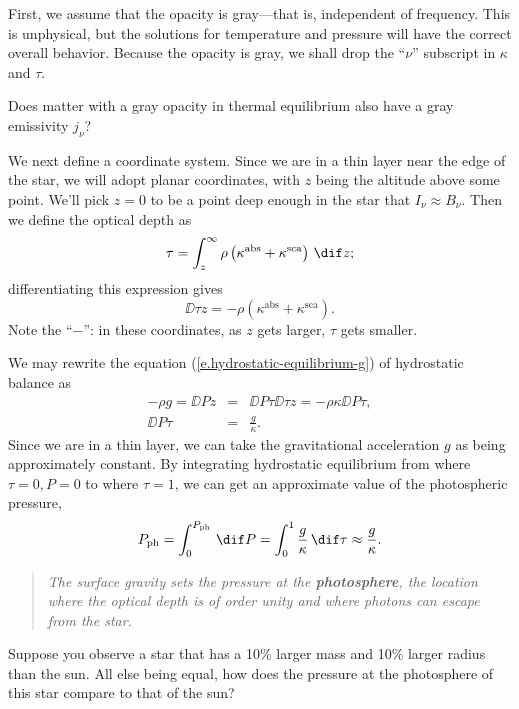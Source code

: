 First, we assume that the opacity is gray---that is, independent of frequency. This is unphysical, but the solutions for temperature and pressure will have the correct overall behavior. Because the opacity is gray, we shall drop the ``$\nu$'' subscript in $\kappa$ and $\tau$.

\begin{exercisebox}
Does matter with a gray opacity in thermal equilibrium also have a gray emissivity $j_{\nu}$?
\end{exercisebox}

We next define a coordinate system. Since we are in a thin layer near the edge of the star, we will adopt planar coordinates, with $z$ being the altitude above some point. We'll pick $z=0$ to be a point deep enough in the star that $I_{\nu}\approx B_{\nu}$. Then we define the optical depth as
\begin{equation}\label{e.optical-depth-planar}
	\tau = \int_{z}^{\infty} \rho\left(\kappa^{\mathrm{abs}}+\kappa^{\mathrm{sca}}\right)\,\dif z ;
\end{equation}
differentiating this expression gives
\[
	\DD{\tau}{z} = -\rho\left(\kappa^{\mathrm{abs}}+\kappa^{\mathrm{sca}}\right).
\]
Note the ``$-$'': in these coordinates, as $z$ gets larger, $\tau$ gets smaller.

We may rewrite the equation (\ref{e.hydrostatic-equilibrium-g}) of hydrostatic balance as
\begin{eqnarray}
	-\rho g = \DD{P}{z} &=& \DD{P}{\tau}\DD{\tau}{z} = -\rho\kappa\DD{P}{\tau},\nonumber\\
	\DD{P}{\tau} &=& \frac{g}{\kappa}.
\label{e.P-tau}
\end{eqnarray}
Since we are in a thin layer, we can take the gravitational acceleration $g$ as being approximately constant. By integrating hydrostatic equilibrium from where $\tau = 0, P = 0$ to where $\tau = 1$, we can get an approximate value of the photospheric pressure,
\[
	P_{\mathrm{ph}} = \int_{0}^{P_{\mathrm{ph}}}\,\dif P = \int_{0}^{1}\frac{g}{\kappa}\,\dif\tau \approx \frac{g}{\kappa}.
\]
\begin{quote}
\emph{The surface gravity sets the pressure at the \textbf{photosphere}, the location where the optical depth is of order unity and where photons can escape from the star.}
\end{quote}

\begin{exercisebox}
Suppose you observe a star that has a 10\% larger mass and 10\% larger radius than the sun. All else being equal, how does the pressure at the photosphere of this star compare to that of the sun?
\end{exercisebox}

